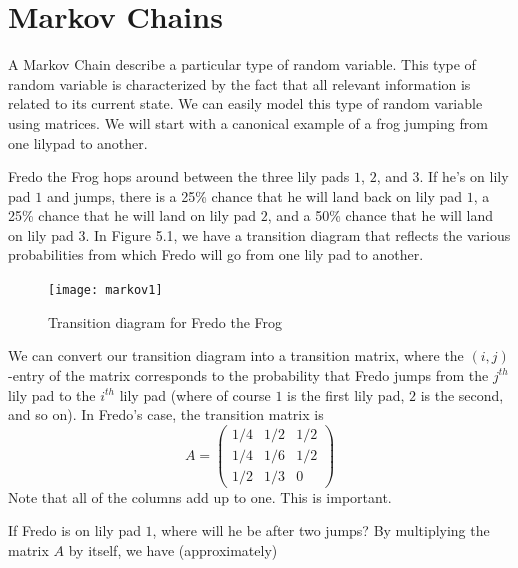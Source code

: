 \label{Ch:Markov}


\section*{Markov Chains}


A Markov Chain describe a particular type of random variable. This type of random variable is characterized by the fact that all relevant information is related to its current state. We can easily model this type of random variable using matrices. We will start with a canonical example of a frog jumping from one lilypad to another.

Fredo the Frog hops around between the three lily pads $1$, $2$, and $3$.  If he's on lily pad $1$ and jumps, there is a 25\% chance that he will land back on lily pad $1$, a 25\% chance that he will land on lily pad $2$, and a 50\% chance that he will land on lily pad $3$.  In Figure 5.1, we have a transition diagram that reflects the various probabilities from which Fredo will go from one lily pad to another.

\begin{figure}[h!]
\label{markov1_fig1}
\begin{center}
\texttt{[image: markov1]}
\end{center}
\caption{Transition diagram for Fredo the Frog}
\end{figure}

We can convert our transition diagram into a transition matrix, where the $(i,j)$-entry of the matrix corresponds to the probability that Fredo jumps from the $j^{th}$ lily pad to the $i^{th}$ lily pad (where of course $1$ is the first lily pad, $2$ is the second, and so on).  In Fredo's case, the transition matrix is
\[
A = \begin{pmatrix}
1/4 & 1/2 & 1/2\\
1/4 & 1/6 & 1/2\\
1/2 & 1/3 & 0
\end{pmatrix}
\]
Note that all of the columns add up to one.  This is important.

If Fredo is on lily pad $1$, where will he be after two jumps?  By multiplying the matrix $A$ by itself, we have (approximately)

